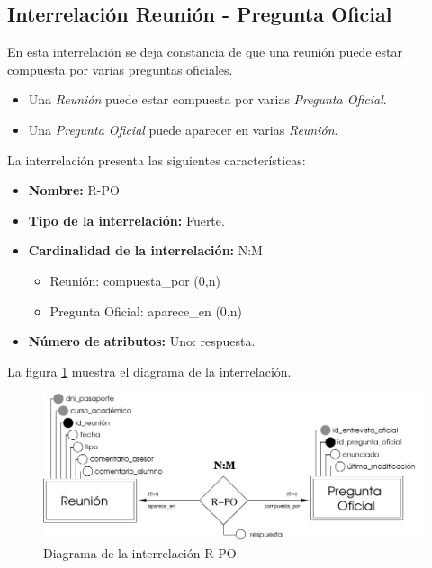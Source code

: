 \subsection{Interrelación Reunión - Pregunta Oficial}

   \begin{description}
      \item[Definición] En esta interrelación se deja constancia de que una
      reunión puede estar compuesta por varias preguntas oficiales.

      \begin{itemize}
       \item Una \textit{Reunión} puede estar compuesta por varias
             \textit{Pregunta Oficial}.
       \item Una \textit{Pregunta Oficial} puede aparecer en varias
             \textit{Reunión}.
      \end{itemize}

      \item[Características] La interrelación presenta las siguientes
                             características:

         \begin{itemize}
            \item \textbf{Nombre:} R-PO
            \item \textbf{Tipo de la interrelación:} Fuerte.
            \item \textbf{Cardinalidad de la interrelación:} N:M
                  \begin{itemize}
                     \item Reunión: compuesta\_por (0,n)
                     \item Pregunta Oficial: aparece\_en (0,n)
                  \end{itemize}
            \item \textbf{Número de atributos:} Uno: respuesta.
         \end{itemize}

      \item[Diagrama] La figura \ref{diagramaR-PO} muestra el diagrama de la
                      interrelación.

      \item \begin{figure}[!ht]
            \begin{center}
            \includegraphics[]{07.Modelo_Entidad-Interrelacion/7.3.Analisis_Interrelaciones/diagramas/R-PO.pdf}
            \caption{Diagrama de la interrelación R-PO.}
            \label{diagramaR-PO}
            \end{center}
         \end{figure}


\end{description}
